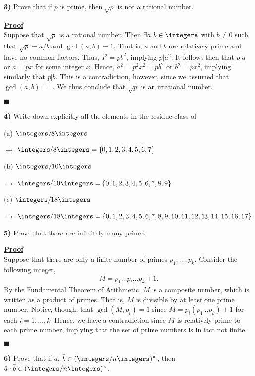 \documentclass[12pt,a4paper]{article}
\newcommand{\prob}[2]{\textbf{#1)} #2}
\newenvironment{proof}
{
\textbf{\underline{Proof}} \\
}
{
\begin{flushright}
$\blacksquare$
\end{flushright}}
\begin{document}
\prob{3}{Prove that if $p$ is prime, then $\sqrt{p}$ is not a rational number.} 

\begin{proof}
Suppose that $\sqrt{p}$ is a rational number. Then $\exists a,b \in \integers$ with $b \not= 0$ such that $\sqrt{p} = a/b$ and $\gcd(a,b) = 1$. That is, $a$ and $b$ are relatively prime and have no common factors. Thus, $a^2 = pb^2$, implying $p|a^2$. It follows then that $p|a$ or $a = px$ for some integer $x$. Hence, $a^2 = p^2x^2 = pb^2$ or $b^2 = px^2$, implying similarly that $p|b$. This is a contradiction, however, since we assumed that $\gcd(a,b) = 1$. We thus conclude that $\sqrt{p}$ is an irrational number.
\end{proof}

\prob{4}{Write down explicitly all the elements in the residue class of}

(a) $\integers/8\integers$

$\rightarrow$ $\integers/8\integers = \{\bar{0},\bar{1},\bar{2},\bar{3},\bar{4},\bar{5},\bar{6},\bar{7}\}$

(b) $\integers/10\integers$

$\rightarrow$ $\integers/10\integers = \{\bar{0},\bar{1},\bar{2},\bar{3},\bar{4},\bar{5},\bar{6},\bar{7},\bar{8},\bar{9}\}$

(c) $\integers/18\integers$

$\rightarrow$ $\integers/18\integers = \{\bar{0},\bar{1},\bar{2},\bar{3},\bar{4},\bar{5},\bar{6},\bar{7},\bar{8},\bar{9},\bar{10},\bar{11},\bar{12},\bar{13},\bar{14},\bar{15},\bar{16},\bar{17}\}$

\prob{5}{Prove that there are infinitely many primes.}

\begin{proof}
Suppose that there are only a finite number of primes $p_1,\hdots,p_k$. Consider the following integer,
\begin{align*}
M = p_1\hdots p_i \hdots p_k + 1.
\end{align*}
By the Fundamental Theorem of Arithmetic, $M$ is a composite number, which is written as a product of primes. That is, $M$ is divisible by at least one prime number. Notice, though, that $\gcd(M,p_i) = 1$ since $M = p_i(p_1 \hdots p_k) + 1$ for each $i = 1,\hdots,k$. Hence, we have a contradiction since $M$ is relatively prime to each prime number, implying that the set of prime numbers is in fact not finite.
\end{proof}

\prob{6}{Prove that if $\bar{a}$, $\bar{b} \in (\integers/n\integers)^{\times}$, then $\bar{a} \cdot \bar{b} \in (\integers/n\integers)^{\times}$.}
\end{document}
